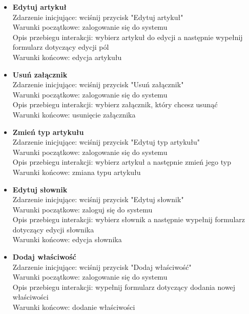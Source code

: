 \documentclass{article}
\begin{document}
\begin{itemize}
	
	\item \textbf{Edytuj artykuł}
	\\Zdarzenie inicjujące: wciśnij przycisk "Edytuj artykuł"
	\\Warunki początkowe: zalogowanie się do systemu
	\\Opis przebiegu interakcji: wybierz artykuł do edycji a następnie wypełnij formularz dotyczący edycji pól
	\\Warunki końcowe: edycja artykułu

	
	\item \textbf{Usuń załącznik}
	\\Zdarzenie inicjujące: wciśnij przycisk "Usuń załącznik"
	\\Warunki początkowe: zalogowanie się do systemu
	\\Opis przebiegu interakcji: wybierz załącznik, który chcesz usunąć
	\\Warunki końcowe: usunięcie załącznika

	
	\item \textbf{Zmień typ artykułu}	
	\\Zdarzenie inicjujące: wciśnij przycisk "Edytuj typ artykułu"
	\\Warunki początkowe: zalogowanie się do systemu
	\\Opis przebiegu interakcji: wybierz artykuł a następnie zmień jego typ
	\\Warunki końcowe: zmiana typu artykułu
	
	\newpage
	
	\item \textbf{Edytuj słownik}
	\\Zdarzenie inicjujące: wciśnij przycisk "Edytuj słownik"
	\\Warunki początkowe: zaloguj się do systemu
	\\Opis przebiegu interakcji: wybierz słownik a następnie wypełnij formularz dotyczący edycji słownika
	\\Warunki końcowe: edycja słownika
	
	
	\item \textbf{Dodaj właściwość}
	\\Zdarzenie inicjujące: wciśnij przycisk "Dodaj właściwość"
	\\Warunki początkowe: zalogowanie się do systemu
	\\Opis przebiegu interakcji: wypełnij formularz dotyczący dodania nowej właściwości
	\\Warunki końcowe: dodanie właściwości


\end{itemize}
\end{document}
